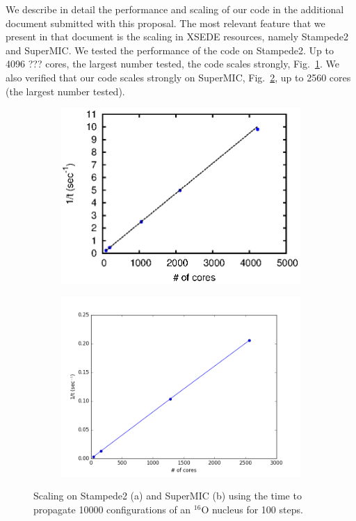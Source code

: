 \documentclass[12pt,letterpaper]{article}
\begin{document}
We describe in detail the 
performance and scaling of our code in the additional document submitted 
with this proposal. The most relevant feature that we present in that 
document is the scaling in XSEDE resources, namely Stampede2 and SuperMIC.
We tested the 
performance of the code on Stampede2. Up to
{\color{red} 4096 ???}
cores, the 
largest number tested, the code scales strongly, Fig.~\ref{fig:stampede}.
We also verified that our code
scales strongly on SuperMIC, Fig.~\ref{fig:supermic}, up to 2560 cores (the 
largest number tested).

\begin{figure}[!htb]
\centering
\begin{subfigure}{.45\textwidth}
  \centering
  \includegraphics[width=\textwidth]{stampede.eps}
  \caption{}
  \label{fig:stampede}
\end{subfigure}%
\hspace{0.01\textwidth}
\begin{subfigure}{.45\textwidth}
  \centering
  \includegraphics[width=\textwidth]{supermic.png}
  \caption{}
  \label{fig:supermic}
\end{subfigure}
\caption{Scaling on Stampede2 (a) and SuperMIC (b) using the time to propagate 
10000 configurations of an $^{16}$O nucleus for 100 steps.}
\label{fig:scaling}
\end{figure}
\end{document}
